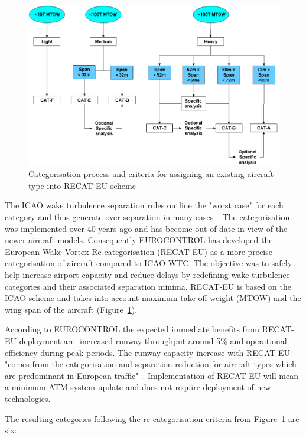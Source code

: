 \begin{figure}[h]
    \centering
    \includegraphics[width=1\textwidth]{graphics/Criteria_RECAT.png}
    \caption[RECAT-EU categorisation criteria]{Categorisation process and criteria for assigning an existing aircraft type into RECAT-EU scheme~\cite[p.~15]{rooseleer2015recat}} \label{fig:RECAT_criteria}
\end{figure}

The ICAO wake turbulence separation rules outline the "worst case" for each category and thus generate over-separation in many cases~\cite{noauthor_recat_2018, rooseleer2015recat}. The categorisation was implemented over 40 years ago and has become out-of-date in view of the newer aircraft models. Consequently EUROCONTROL has developed the European Wake Vortex Re-categorisation (RECAT-EU) as a more precise categorisation of aircraft compared to ICAO WTC. The objective was to safely help increase airport capacity and reduce delays by redefining wake turbulence categories and their associated separation 
minima. RECAT-EU is based on the ICAO scheme and takes into account maximum take-off weight (MTOW) and the wing span of the aircraft (Figure~\ref{fig:RECAT_criteria}).

According to EUROCONTROL the expected immediate benefits from RECAT-EU deployment are: increased runway throughput around 5\% and operational efficiency during peak periods. The runway capacity increase with RECAT-EU "comes from the categorisation and separation reduction for aircraft types which are predominant in European traffic"~\cite[p.~22]{rooseleer2015recat}. Implementation of RECAT-EU will mean a minimum ATM system update and does not require deployment of new technologies.

The resulting categories following the re-categorisation criteria from Figure~\ref{fig:RECAT_criteria} are six:

